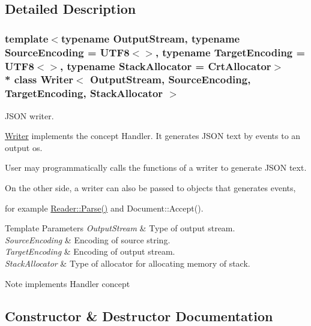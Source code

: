 \subsection{Detailed Description}
\subsubsection*{template$<$typename Output\+Stream, typename Source\+Encoding = U\+T\+F8$<$$>$, typename Target\+Encoding = U\+T\+F8$<$$>$, typename Stack\+Allocator = Crt\+Allocator$>$\\*
class Writer$<$ Output\+Stream, Source\+Encoding, Target\+Encoding, Stack\+Allocator $>$}

J\+S\+ON writer. 

\hyperlink{class_writer}{Writer} implements the concept Handler. It generates J\+S\+ON text by events to an output os.

User may programmatically calls the functions of a writer to generate J\+S\+ON text.

On the other side, a writer can also be passed to objects that generates events,

for example \hyperlink{class_generic_reader_a0c450620d14ff1824e58bb7bd9b42099}{Reader\+::\+Parse()} and Document\+::\+Accept().


\begin{DoxyTemplParams}{Template Parameters}
{\em Output\+Stream} & Type of output stream. \\
\hline
{\em Source\+Encoding} & Encoding of source string. \\
\hline
{\em Target\+Encoding} & Encoding of output stream. \\
\hline
{\em Stack\+Allocator} & Type of allocator for allocating memory of stack. \\
\hline
\end{DoxyTemplParams}
\begin{DoxyNote}{Note}
implements Handler concept 
\end{DoxyNote}


\subsection{Constructor \& Destructor Documentation}
